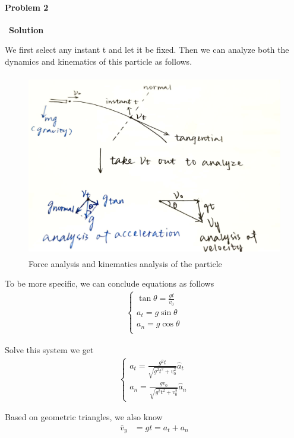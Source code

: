 \documentclass[12pt,a4paper]{article}
\begin{document}
\paragraph{\large \textbf{Problem 2}}~{\textbf{Solution}}
\vspace{2mm}
\par We first select any instant t and let it be fixed. Then we can analyze both the dynamics and kinematics of this particle as follows.
\begin{figure}[H]
    \centering
    \includegraphics[height = 8cm]{3.jpg}
    \caption{Force analysis and kinematics analysis of the particle}
\end{figure}
\par To be more specific, we can conclude equations as follows
\begin{align*}
	\left\{ \begin{array}{c}
	\tan\theta = \frac{gt}{v_0}\\
	a_t = g\sin\theta\\
	a_n = g\cos\theta\\
	\end{array}	 \right.
\end{align*}
\par Solve this system we get
\begin{align*}
	\left\{ \begin{array}{c}
	a_t = \frac{g^2t}{\sqrt{g^2t^2+v_0^2}}\hat{a}_t\\
	a_n = \frac{gv_0}{\sqrt{g^2t^2+v_0^2}}\hat{a}_n
	\end{array} \right.
\end{align*}
\par Based on geometric triangles, we also know
\begin{align*}
	\bar{v}_y &= gt = a_t + a_n\\
\end{align*}
\end{document}
